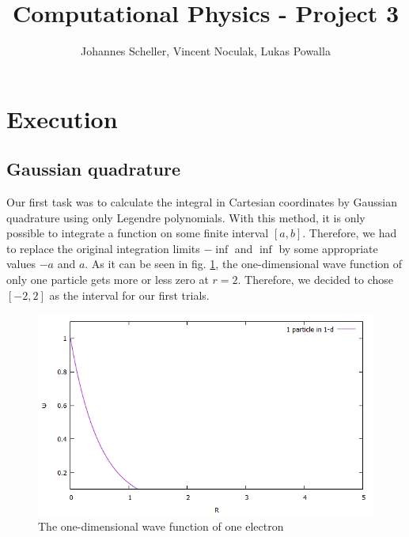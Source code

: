 \documentclass[10pt,a4paper]{article}
\author{Johannes Scheller, Vincent Noculak, Lukas Powalla}
\title{Computational Physics - Project 3}
\begin{document}
\maketitle
\newpage
\tableofcontents
\newpage
\section{Execution}

\subsection{Gaussian quadrature}
Our first task was to calculate the integral in Cartesian coordinates by Gaussian quadrature using only Legendre polynomials. With this method, it is only possible to integrate a function on some finite interval $[a,b]$. Therefore, we had to replace the original integration limits $-\inf$ and $\inf$ by some appropriate values $-a$ and $a$. As it can be seen in fig. \ref{oneparticle}, the one-dimensional wave function of only one particle gets more or less zero at $r=2$. Therefore, we decided to chose $[-2,2]$ as the interval for our first trials.
\begin{figure}[h]
	\includegraphics[width=\textwidth]{Psi.png}
	\caption{The one-dimensional wave function of one electron \label{oneparticle}}
\end{figure}
\end{document}
